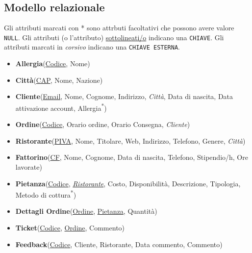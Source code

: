 \documentclass[10pt]{article}
\begin{document}
		\subsection{Modello relazionale}
		\begin{framed}
		\noindent Gli attributi marcati con * sono attrbuti facoltativi che possono avere valore \texttt{\color{blue}NULL}. \newline
		Gli attributi (o l'attributo) \underline{sottolineati/o} indicano una \texttt{CHIAVE}. \newline
		Gli attributi marcati in \textit{corsivo} indicano una \texttt{CHIAVE ESTERNA}.
		\end{framed}
		\begin{itemize}[noitemsep]
			\item[] \textbf{Allergia}(\underline{Codice}, Nome)
			\item[] \textbf{Citt\`a}(\underline{CAP}, Nome, Nazione)
			\item[] \textbf{Cliente}(\underline{Email}, Nome, Cognome, Indirizzo, \textit{Citt\`a}, Data di nascita, Data attivazione account, Allergia\textsuperscript{*})
			\item[] \textbf{Ordine}(\underline{Codice}, Orario ordine, Orario Consegna, \textit{Cliente})
			\item[] \textbf{Ristorante}(\underline{PIVA}, Nome, Titolare, Web, Indirizzo, Telefono, Genere, \textit{Citt\`a})
			\item[] \textbf{Fattorino}(\underline{CF}, Nome, Cognome, Data di nascita, Telefono, Stipendio/h, Ore lavorate)			
			\item[] \textbf{Pietanza}(\underline{Codice}, \underline{\textit{Ristorante}}, Costo, Disponibilit\`a, Descrizione, Tipologia, Metodo di cottura\textsuperscript{*})
			\item[] \textbf{Dettagli Ordine}(\underline{Ordine}, \underline{Pietanza}, Quantit\`a)
			\item[] \textbf{Ticket}(\underline{Codice}, \underline{Ordine}, Commento)
			\item[] \textbf{Feedback}(\underline{Codice}, Cliente, Ristorante, Data commento, Commento)
		\end{itemize}
\end{document}
